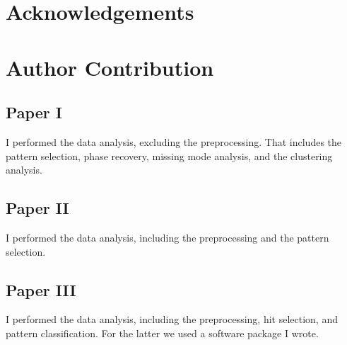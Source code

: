 \chapter*{Acknowledgements}




\chapter*{Author Contribution}

\section*{Paper I}
I performed the data analysis, excluding the preprocessing. That includes the pattern selection, phase recovery, missing mode analysis, and the clustering analysis.

\section*{Paper II}
I performed the data analysis, including the preprocessing and the pattern selection.

\section*{Paper III}
I performed the data analysis, including the preprocessing, hit selection, and pattern classification. For the latter we used a software package I wrote.
